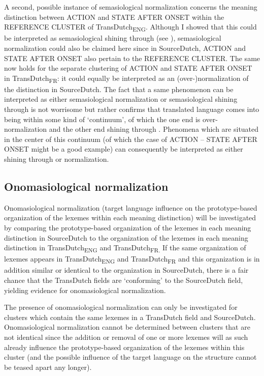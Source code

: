 A second, possible instance of semasiological normalization concerns the meaning distinction between ACTION and STATE AFTER ONSET within the REFERENCE CLUSTER of TransDutch\textsubscript{ENG}. Although I showed that this could be interpreted as semasiological shining through (see ), semasiological normalization could also be claimed here since in SourceDutch, ACTION and STATE AFTER ONSET also pertain to the REFERENCE CLUSTER. The same now holds for the separate clustering of ACTION and STATE AFTER ONSET in TransDutch\textsubscript{FR}: it could equally be interpreted as an (over-)normalization of the distinction in SourceDutch. The fact that a same phenomenon can be interpreted as either semasiological normalization or semasiological shining through is not worrisome but rather confirms that translated language comes into being within some kind of ‘continuum’, of which the one end is over-normalization and the other end shining through \citep[272]{hansen-schirra_towards_2012}. Phenomena which are situated in the center of this continuum (of which the case of ACTION – STATE AFTER ONSET might be a good example) can consequently be interpreted as either shining through or normalization.

\subsection{Onomasiological normalization}
\label{sec:4.7.2}  
Onomasiological normalization (target language influence on the prototype-based organization of the lexemes within each meaning distinction) will be investigated by comparing the prototype-based organization of the lexemes in each meaning distinction in SourceDutch to the organization of the lexemes in each meaning distinction in TransDutch\textsubscript{ENG} and TransDutch\textsubscript{FR.} If the same organization of lexemes appears in TransDutch\textsubscript{ENG} and TransDutch\textsubscript{FR} and this organization is in addition similar or identical to the organization in SourceDutch, there is a fair chance that the TransDutch fields are ‘conforming’ to the SourceDutch field, yielding evidence for onomasiological normalization.

The presence of onomasiological normalization can only be investigated for clusters which contain the same lexemes in a TransDutch field and SourceDutch. Onomasiological normalization cannot be determined between clusters that are not identical since the addition or removal of one or more lexemes will as such already influence the prototype-based organization of the lexemes within this cluster (and the possible influence of the target language on the structure cannot be teased apart any longer).

